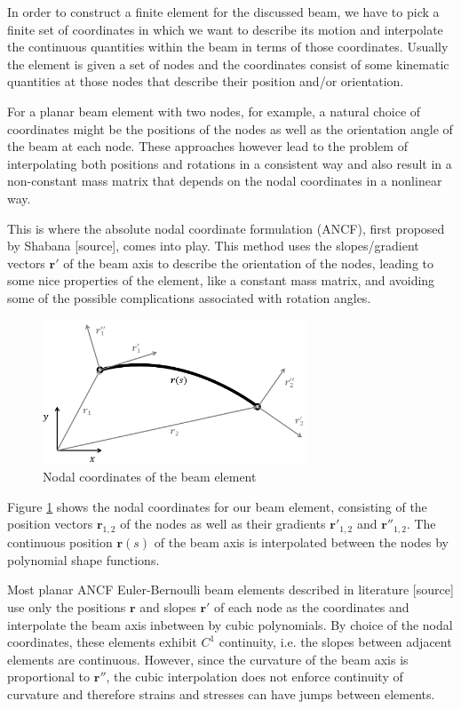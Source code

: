 In order to construct a finite element for the discussed beam, we have to pick a finite set of coordinates in which we want to describe its motion and interpolate the continuous quantities within the beam in terms of those coordinates.
Usually the element is given a set of nodes and the coordinates consist of some kinematic quantities at those nodes that describe their position and/or orientation.

For a planar beam element with two nodes, for example, a natural choice of coordinates might be the positions of the nodes as well as the orientation angle of the beam at each node.
These approaches however lead to the problem of interpolating both positions and rotations in a consistent way and also result in a non-constant mass matrix that depends on the nodal coordinates in a nonlinear way.

This is where the absolute nodal coordinate formulation (ANCF), first proposed by Shabana [source], comes into play.
This method uses the slopes/gradient vectors $\boldsymbol{r}'$ of the beam axis to describe the orientation of the nodes, leading to some nice properties of the element, like a constant mass matrix, and avoiding some of the possible complications associated with rotation angles.

\begin{figure}[h]
\centering
\includegraphics[width=0.7\textwidth]{figures/elements/beam-kinematics-shapefunctions}
\caption{Nodal coordinates of the beam element}
\label{fig:beam-kinematics-shapefunction}
\end{figure}

Figure \ref{fig:beam-kinematics-shapefunction} shows the nodal coordinates for our beam element, consisting of the position vectors $\boldsymbol{r}_{1,2}$ of the nodes as well as their gradients $\boldsymbol{r}'_{1,2}$ and $\boldsymbol{r}''_{1,2}$.
The continuous position $\boldsymbol{r}(s)$ of the beam axis is interpolated between the nodes by polynomial shape functions.

Most planar ANCF Euler-Bernoulli beam elements described in literature [source] use only the positions $\boldsymbol{r}$ and slopes $\boldsymbol{r}'$ of each node as the coordinates and interpolate the beam axis inbetween by cubic polynomials.
By choice of the nodal coordinates, these elements exhibit $C^1$ continuity, i.e. the slopes between adjacent elements are continuous.
However, since the curvature of the beam axis is proportional to $\boldsymbol{r}''$, the cubic interpolation does not enforce continuity of curvature and therefore strains and stresses can have jumps between elements.

